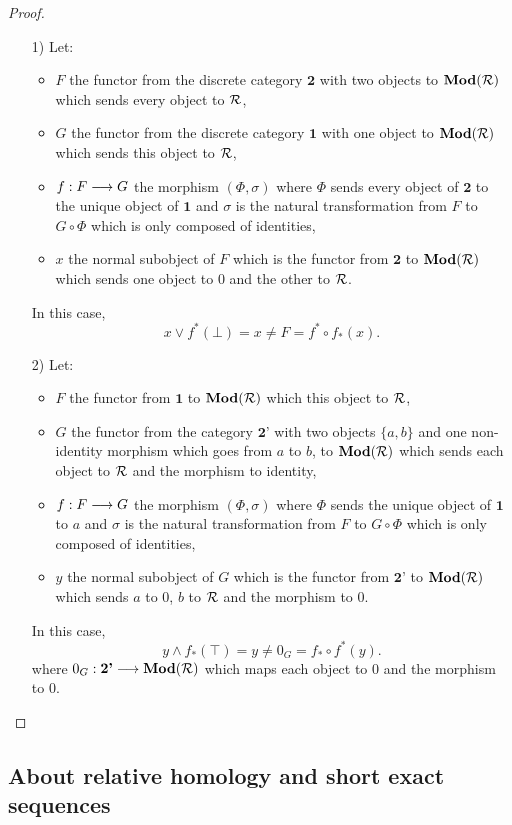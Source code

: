 \begin{proof}~
\begin{itemize}
	\item[1)] Let:
		\begin{itemize}
			\item $F$ the functor from the discrete category $\textbf{2}$ with two objects to $\textbf{Mod}(\mathcal{R})$ which sends every object to $\mathcal{R}$,
			\item $G$ the functor from the discrete category $\textbf{1}$ with one object to $\textbf{Mod}(\mathcal{R})$ which sends this object to $\mathcal{R}$,
			\item $f : F \longrightarrow G$ the morphism $(\Phi,\sigma)$ where $\Phi$ sends every object of $\textbf{2}$ to the unique object of $\textbf{1}$ and $\sigma$ is the natural transformation from $F$ to $G\circ\Phi$ which is only composed of identities,
			\item $x$ the normal subobject of $F$ which is the functor from $\textbf{2}$ to $\textbf{Mod}(\mathcal{R})$ which sends one object to $0$ and the other to $\mathcal{R}$.
		\end{itemize}
In this case, $$x \vee f^*(\bot) = x \neq F = f^*\circ f_*(x).$$
	\item[2)] Let:
		\begin{itemize}
			\item $F$ the functor from $\textbf{1}$ to $\textbf{Mod}(\mathcal{R})$ which this object to $\mathcal{R}$,
			\item $G$ the functor from the category $\textbf{2'}$ with two objects $\{a,b\}$ and one non-identity morphism which goes from $a$ to $b$, to $\textbf{Mod}(\mathcal{R})$ which sends each object to $\mathcal{R}$ and the morphism to identity,
			\item $f : F \longrightarrow G$ the morphism $(\Phi,\sigma)$ where $\Phi$ sends the unique object of $\textbf{1}$ to $a$ and $\sigma$ is the natural transformation from $F$ to $G\circ\Phi$ which is only composed of identities,
			\item $y$ the normal subobject of $G$ which is the functor from $\textbf{2'}$ to $\textbf{Mod}(\mathcal{R})$ which sends $a$ to $0$, $b$ to $\mathcal{R}$ and the morphism to $0$.
		\end{itemize}
In this case, $$y \wedge f_*(\top) = y \neq 0_G = f_*\circ f^*(y).$$
where $0_G : \textbf{2'} \longrightarrow \textbf{Mod}(\mathcal{R})$ which maps each object to $0$ and the morphism to $0$.
\end{itemize}
\end{proof}

	\subsection{About relative homology and short exact sequences}
	
